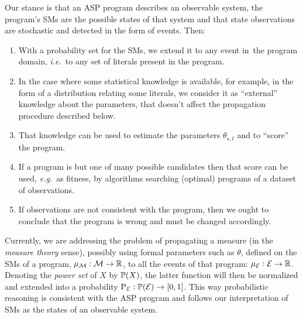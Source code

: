 \documentclass[x11names]{tlp}
\begin{document}
Our stance is that an \ac{ASP} program describes an observable system, the
program's \aclp{SM} are the possible states of that system and that state
observations are stochastic and detected in the form of events. Then:
\begin{enumerate}

	\item With a probability set for the \aclp{SM}, we extend it to any event in\ the
	      program domain, \textit{i.e.}\ to any set of literals present in the program.

	\item In the case where some statistical knowledge is available, for example, in
	      the form of a distribution relating some literals, we consider it as
	      ``external'' knowledge about the parameters, that doesn't affect the
	      propagation procedure described below.

	\item That knowledge can be used to estimate the parameters $\theta_{s,t}$ and to
	      ``score'' the program.

	\item\label{item:program.selection} If a program is but one of many
	      possible candidates then that score can be used, \emph{e.g.}\ as
	      fitness, by algorithms searching (optimal) programs of a dataset of
	      observations.

	\item If observations are not consistent with the program, then we ought to
	      conclude that the program is wrong and must be changed accordingly.

\end{enumerate}

Currently, we are addressing the problem of propagating a measure (in the
\emph{measure theory} sense), possibly using formal parameters such as
$\theta$, defined on the \aclp{SM} of a program, $\pwM: \MODELset \to
	\mathbb{R}$, to all the events of that program: $\pwE: \EVENTSset \to
	\mathbb{R}$. Denoting the \emph{power set} of $X$ by $\powerset{X}$, the
latter function will then be normalized and extended into a probability
$\prE:\powerset{\EVENTSset} \to \intcc{0,1}$. This way probabilistic
reasoning is consistent with the \ac{ASP} program and follows our
interpretation of \aclp{SM} as the states of an observable system.
\end{document}
